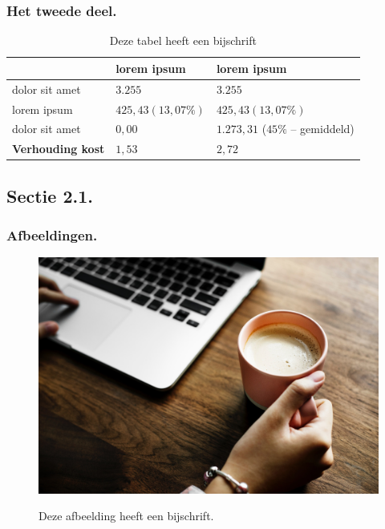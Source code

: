 \documentclass[aspectratio=169]{beamer}
\begin{document}
\begin{frame}
  \frametitle{Het tweede deel.}
  
  \begin{table}
    \begin{tabular}{lll}
      \toprule
                     & \textbf{lorem ipsum} & \textbf{lorem ipsum} \\
      \midrule
      dolor sit amet & $3.255$              & $3.255$ \\
      \midrule
      lorem ipsum    & $425,43 (13,07\%)$   & $425,43 (13,07\%)$ \\
      \midrule
      dolor sit amet & $0,00$               & $1.273,31$ ($45\%$ -- gemiddeld) \\
      \midrule
      \textbf{{\small Verhouding kost}} & \textbf{$1,53$} & \textbf{$2,72$}\\
      \bottomrule
    \end{tabular}
    
    \label{tab:voorbeeld}
    \caption{Deze tabel heeft een bijschrift}
  \end{table}
\end{frame}

\subsection{Sectie 2.1.}

\begin{frame}
  \frametitle{Afbeeldingen.}
  \begin{figure}
    \caption{Deze afbeelding heeft een bijschrift.}
    \includegraphics[height=.8\textheight]{img/beverage-coffee-computer-984536.jpg}
    \label{img:voorbeeld}
  \end{figure}
\end{frame}
\end{document}
